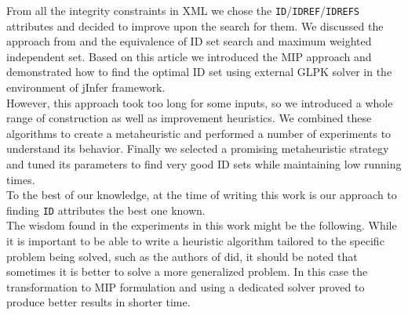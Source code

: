 
From all the integrity constraints in XML we chose the \texttt{ID}/\.\texttt{IDREF}/\.\texttt{IDREFS} attributes and decided to improve upon the search for them. We discussed the approach from \cite{fidax} and the equivalence of ID set search and maximum weighted independent set. Based on this article we introduced the MIP approach and demonstrated how to find the optimal ID set using external GLPK solver in the environment of jInfer framework.\\

However, this approach took too long for some inputs, so we introduced a whole range of construction as well as improvement heuristics. We combined these algorithms to create a metaheuristic and performed a number of experiments to understand its behavior. Finally we selected a promising metaheuristic strategy and tuned its parameters to find very good ID sets while maintaining low running times.\\

To the best of our knowledge, at the time of writing this work is our approach to finding \texttt{ID} attributes the best one known.\\

The wisdom found in the experiments in this work might be the following. While it is important to be able to write a heuristic algorithm tailored to the specific problem being solved, such as the authors of \cite{fidax} did, it should be noted that sometimes it is better to solve a more generalized problem. In this case the transformation to MIP formulation and using a dedicated solver proved to produce better results in shorter time.